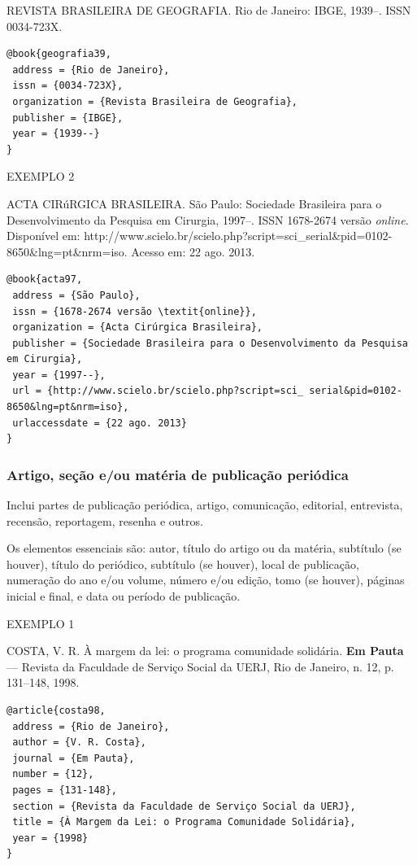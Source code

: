 REVISTA BRASILEIRA DE GEOGRAFIA. Rio de Janeiro: IBGE, 1939--. ISSN 0034-723X.

\begin{verbatim}
@book{geografia39,
 address = {Rio de Janeiro},
 issn = {0034-723X},
 organization = {Revista Brasileira de Geografia},
 publisher = {IBGE},
 year = {1939--}
}
\end{verbatim}

EXEMPLO 2 

ACTA CIRúRGICA BRASILEIRA. São Paulo: Sociedade Brasileira para o Desenvolvimento da Pesquisa em Cirurgia, 1997–. ISSN 1678-2674 versão \textit{online}. Disponível em: http://www.scielo.br/scielo.php?script=sci\_serial\&pid=0102-8650\&lng=pt\&nrm=iso. Acesso em: 22 ago. 2013.

\begin{verbatim}
@book{acta97,
 address = {São Paulo},
 issn = {1678-2674 versão \textit{online}},
 organization = {Acta Cirúrgica Brasileira},
 publisher = {Sociedade Brasileira para o Desenvolvimento da Pesquisa em Cirurgia},
 year = {1997--},
 url = {http://www.scielo.br/scielo.php?script=sci_ serial&pid=0102-8650&lng=pt&nrm=iso},
 urlaccessdate = {22 ago. 2013}
}
\end{verbatim}

\subsubsection{Artigo, seção e/ou matéria de publicação periódica}

Inclui partes de publicação periódica, artigo, comunicação, editorial, entrevista, recensão, reportagem, resenha e outros.

Os elementos essenciais são: autor, título do artigo ou da matéria, subtítulo (se houver), título do periódico, subtítulo (se houver), local de publicação, numeração do ano e/ou volume, número e/ou edição, tomo (se houver), páginas inicial e final, e data ou período de publicação.

EXEMPLO 1

COSTA, V. R. À margem da lei: o programa comunidade solidária. \textbf{Em Pauta} — Revista da Faculdade de Serviço Social da UERJ, Rio de Janeiro, n. 12, p. 131–148, 1998.

\begin{verbatim}
@article{costa98,
 address = {Rio de Janeiro},
 author = {V. R. Costa},
 journal = {Em Pauta},
 number = {12},
 pages = {131-148},
 section = {Revista da Faculdade de Serviço Social da UERJ},
 title = {À Margem da Lei: o Programa Comunidade Solidária},
 year = {1998}
}
\end{verbatim}

